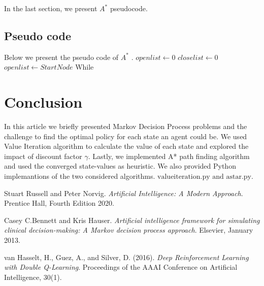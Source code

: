 \documentclass[10pt,a4paper,twocolumn]{article}
\begin{document}
	In the last section, we present $A^{*}$ pseudocode.
	
	\subsection{Pseudo code}
	Below we present the pseudo code of $A^{*}$ .
	\newline
	\newline
	$openlist \leftarrow {0}$
	\newline
	$closelist \leftarrow {0}$
	\newline
	$openlist \leftarrow StartNode$
	\newline
	While 
	
	\section{Conclusion}
	In this article we briefly presented Markov Decision Process problems and the challenge to find the optimal policy for each state an agent could be. We used Value Iteration algorithm to calculate the value of each state and explored the impact of discount factor $\gamma$. Lastly, we implemented A* path finding algorithm and used the converged state-values as heuristic.
	We also provided Python implemantions of the two considered algorithms. $\text{valueiteration.py and astar.py}$.
		
	
	\begin{thebibliography}{9}
		Stuart Russell and Peter Norvig. 
		\textit{Artificial Intelligence: A Modern Approach}. 
		Prentice Hall, Fourth Edition 2020.
		
		Casey C.Bennett and Kris Hauser. 
		\textit{Artificial intelligence framework for simulating clinical decision-making: A Markov decision process approach}. 
		Elsevier, January 2013.
		
		van Hasselt, H., Guez, A., and Silver, D. (2016). 
		\textit{Deep Reinforcement Learning with Double Q-Learning}. 
		Proceedings of the AAAI Conference on Artificial Intelligence, 30(1). 
		

	\end{thebibliography}
	
\end{document}
